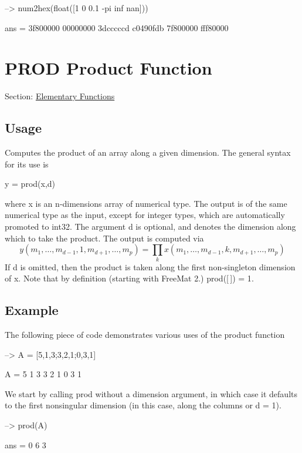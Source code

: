 \begin{DoxyVerbInclude}
--> num2hex(float([1 0 0.1 -pi inf nan]))

ans = 
3f800000
00000000
3dcccccd
c0490fdb
7f800000
fff80000
\end{DoxyVerbInclude}
 \hypertarget{elementary_prod}{}\section{P\-R\-O\-D Product Function}\label{elementary_prod}
Section\-: \hyperlink{sec_elementary}{Elementary Functions} \hypertarget{vtkwidgets_vtkxyplotwidget_Usage}{}\subsection{Usage}\label{vtkwidgets_vtkxyplotwidget_Usage}
Computes the product of an array along a given dimension. The general syntax for its use is \begin{DoxyVerb}   y = prod(x,d)
\end{DoxyVerb}
 where {\ttfamily x} is an {\ttfamily n}-\/dimensions array of numerical type. The output is of the same numerical type as the input, except for integer types, which are automatically promoted to {\ttfamily int32}. The argument {\ttfamily d} is optional, and denotes the dimension along which to take the product. The output is computed via \[ y(m_1,\ldots,m_{d-1},1,m_{d+1},\ldots,m_{p}) = \prod_{k} x(m_1,\ldots,m_{d-1},k,m_{d+1},\ldots,m_{p}) \] If {\ttfamily d} is omitted, then the product is taken along the first non-\/singleton dimension of {\ttfamily x}. Note that by definition (starting with Free\-Mat 2.) {\ttfamily prod(\mbox{[}$\,$\mbox{]}) = 1}. \hypertarget{variables_struct_Example}{}\subsection{Example}\label{variables_struct_Example}
The following piece of code demonstrates various uses of the product function


\begin{DoxyVerbInclude}
--> A = [5,1,3;3,2,1;0,3,1]

A = 
 5 1 3 
 3 2 1 
 0 3 1 
\end{DoxyVerbInclude}


We start by calling {\ttfamily prod} without a dimension argument, in which case it defaults to the first nonsingular dimension (in this case, along the columns or {\ttfamily d = 1}).


\begin{DoxyVerbInclude}
--> prod(A)

ans = 
 0 6 3 
\end{DoxyVerbInclude}


